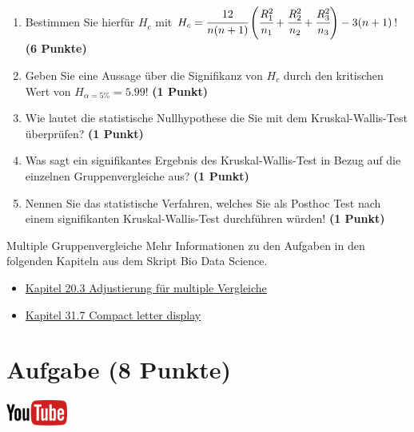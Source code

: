 \documentclass[a4paper, 10pt]{scrartcl}\usepackage[]{graphicx}\usepackage[]{xcolor}
\begin{document}
\begin{enumerate}
\item Bestimmen Sie hierf{\"u}r $H_c$ mit $H_c =
  \cfrac{12}{n(n+1)}\left(\cfrac{R_1^2}{n_1}+\cfrac{R_2^2}{n_2}
    + \cfrac{R_3^2}{n_3}\right)
  - 3(n+1)$! \textbf{(6 Punkte)} 
\item Geben Sie eine Aussage {\"u}ber die Signifikanz von $H_c$ durch
  den kritischen Wert von $H_{\alpha = 5\%} = 5.99$! \textbf{(1 Punkt)}
\item Wie lautet die statistische Nullhypothese die Sie mit dem Kruskal-Wallis-Test
  {\"u}berpr{\"u}fen? \textbf{(1 Punkt)}
\item Was sagt ein signifikantes Ergebnis des Kruskal-Wallis-Test in Bezug
  auf die einzelnen Gruppenvergleiche aus? \textbf{(1 Punkt)}
\item Nennen Sie das statistische Verfahren, welches Sie als Posthoc Test
  nach einem signifikanten Kruskal-Wallis-Test durchf{\"u}hren w{\"u}rden! \textbf{(1 Punkt)}
\end{enumerate} 
\clearpage
\begin{graybox}{Multiple Gruppenvergleiche}
Mehr Informationen zu den Aufgaben in den folgenden Kapiteln aus dem Skript Bio Data Science.
  \begin{itemize}
  \item \href{https://jkruppa.github.io/stat-tests-theorie.html#sec-statistisches-testen-alpha-adjust}{Kapitel 20.3 Adjustierung f{\"u}r multiple Vergleiche}
  \item \href{https://jkruppa.github.io/stat-tests-posthoc.html#sec-compact-letter}{Kapitel 31.7 Compact letter display}
  \end{itemize}
\end{graybox}
\clearpage

\section{Aufgabe \hfill (8 Punkte)}


 \hfill\href{https://youtu.be/hr_jPd1hpKY}{\includegraphics[width =
   2cm]{img/youtube}}\\[1Ex]
\end{document}
